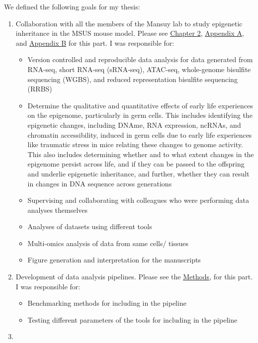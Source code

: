 \documentclass[12pt,twoside]{reedthesis}
\begin{document}
We defined the following goals for my thesis:
\begin{enumerate}
\def\labelenumi{\arabic{enumi}.}
\item
  Collaboration with all the members of the Mansuy lab to study
  epigenetic inheritance in the MSUS mouse model. Please see \protect\hyperlink{chapter2}{Chapter 2}, \protect\hyperlink{aa}{Appendix A}, and \protect\hyperlink{ab}{Appendix B} for this part. I was responsible for:
  \begin{itemize}
  \item
    Version controlled and reproducible data analysis for data
    generated from RNA-seq, short RNA-seq (sRNA-seq), ATAC-seq, whole-genome bisulfite sequencing (WGBS), and reduced representation bisulfite sequencing (RRBS)
  \item
    Determine the qualitative and quantitative effects of early life
    experiences on the epigenome, particularly in germ cells. This
    includes identifying the epigenetic changes, including DNAme,
    RNA expression, ncRNAs, and chromatin
    accessibility, induced in germ cells due to early life
    experiences like traumatic stress in mice relating these changes
    to genome activity. This also includes determining whether and
    to what extent changes in the epigenome persist across life, and
    if they can be passed to the offspring and underlie epigenetic
    inheritance, and further, whether they can result in changes in
    DNA sequence across generations
  \item
    Supervising and collaborating with colleagues who were
    performing data analyses themselves
  \item
    Analyses of datasets using different tools
  \item
    Multi-omics analysis of data from same cells/ tissues
  \item
    Figure generation and interpretation for the manuscripts
  \end{itemize}
\item
  Development of data analysis pipelines. Please see the \protect\hyperlink{methods}{Methods}, for
  this part. I was responsible for:
  \begin{itemize}
  \item
    Benchmarking methods for including in the pipeline
  \item
    Testing different parameters of the tools for including in the
    pipeline
  \end{itemize}
\item

\end{enumerate}
\end{document}
